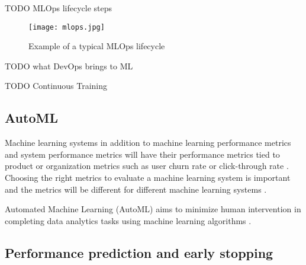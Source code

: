 TODO MLOps lifecycle steps

\begin{figure}[h]
    \centering
    \texttt{[image: mlops.jpg]}
    \caption{Example of a typical MLOps lifecycle}
    \label{fig:mlops}
\end{figure}

TODO what DevOps brings to ML

TODO Continuous Training

\subsection{AutoML}

Machine learning systems in addition to machine learning performance metrics and system performance metrics will have their performance metrics tied to product or organization metrics such as user churn rate or click-through rate \parencite{shankarOperationalizingMachineLearning2022}. Choosing the right metrics to evaluate a machine learning system is important and the metrics will be different for different machine learning systems \parencite{shankarOperationalizingMachineLearning2022}.

Automated Machine Learning (AutoML) aims to minimize human intervention in completing data analytics tasks using machine learning algorithms \parencite{yangIoTDataAnalytics2022}.

\subsection{Performance prediction and early stopping}

